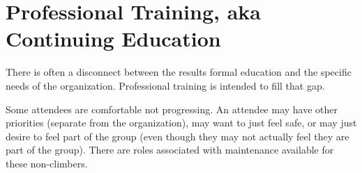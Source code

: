 \section{Professional Training, aka Continuing Education\label{sec:professional-training}}

There is often a disconnect between the results formal education and the specific needs of the organization. Professional training is intended to fill that gap.  

Some attendees are comfortable not progressing. An attendee may have other priorities (separate from the organization), may want to just feel safe, or may just desire to feel part of the group (even though they may not actually feel they are part of the group).
There are roles associated with maintenance available for these non-climbers.